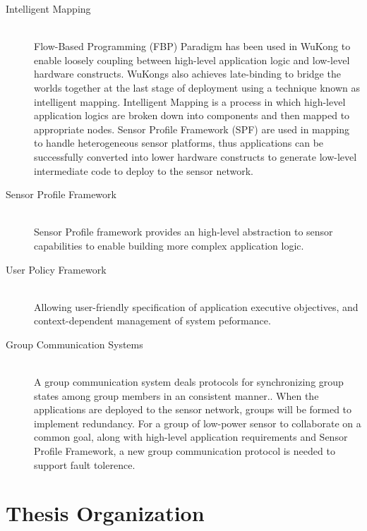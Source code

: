 \begin{description}
\item[Intelligent Mapping] \hfill \\
Flow-Based Programming (FBP) Paradigm has been used in WuKong to enable loosely
coupling between high-level application logic and low-level hardware
constructs. WuKongs
also achieves late-binding to bridge the worlds together at the last stage of
deployment using a technique
known as intelligent mapping. Intelligent Mapping is a process in which
high-level application logics are broken down into components and then mapped
to appropriate nodes. Sensor Profile Framework (SPF) are used in mapping to
handle heterogeneous sensor platforms, thus applications can be successfully
converted into lower hardware constructs to generate low-level intermediate
code to deploy to the sensor network.

\item[Sensor Profile Framework] \hfill \\
Sensor Profile framework provides an high-level abstraction to
sensor capabilities to enable building more complex application
logic.\cite{Reijers}

\item[User Policy Framework] \hfill \\
Allowing user-friendly specification of application executive objectives, and
context-dependent management of system peformance.

\item[Group Communication Systems] \hfill \\
A group communication system deals protocols for
synchronizing group states among group members in an consistent manner.\cite{Birman2012c}.
When the applications are deployed to the sensor network, groups will be
formed to implement redundancy. For a group of low-power sensor to collaborate on
a common goal, along with high-level application requirements and Sensor
Profile Framework, a new group communication protocol is needed to support 
fault tolerence.

\end{description}

\section{Thesis Organization}

